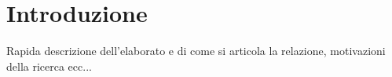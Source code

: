 \section{Introduzione}
Rapida descrizione dell'elaborato e di come si articola la relazione, motivazioni della ricerca ecc...